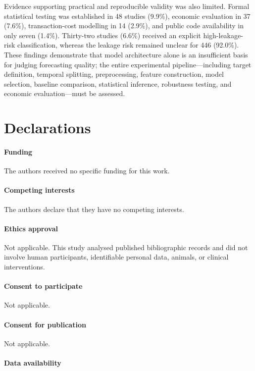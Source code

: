 \documentclass[pdflatex,sn-mathphys-num]{sn-jnl}%
\theoremstyle{thmstyleone}%
\theoremstyle{thmstyletwo}%
\theoremstyle{thmstylethree}%
\begin{document}
Evidence supporting practical and reproducible validity was also limited.
Formal statistical testing was established in 48 studies (9.9\%), economic
evaluation in 37 (7.6\%), transaction-cost modelling in 14 (2.9\%), and
public code availability in only seven (1.4\%). Thirty-two studies (6.6\%)
received an explicit high-leakage-risk classification, whereas the leakage
risk remained unclear for 446 (92.0\%). These findings demonstrate that
model architecture alone is an insufficient basis for judging forecasting
quality; the entire experimental pipeline---including target definition,
temporal splitting, preprocessing, feature construction, model selection,
baseline comparison, statistical inference, robustness testing, and
economic evaluation---must be assessed.





\section*{Declarations}

\paragraph{Funding}
The authors received no specific funding for this work.

\paragraph{Competing interests}
The authors declare that they have no competing interests.

\paragraph{Ethics approval}
Not applicable. This study analysed published bibliographic records
and did not involve human participants, identifiable personal data,
animals, or clinical interventions.

\paragraph{Consent to participate}
Not applicable.

\paragraph{Consent for publication}
Not applicable.

\paragraph{Data availability}
\end{document}
